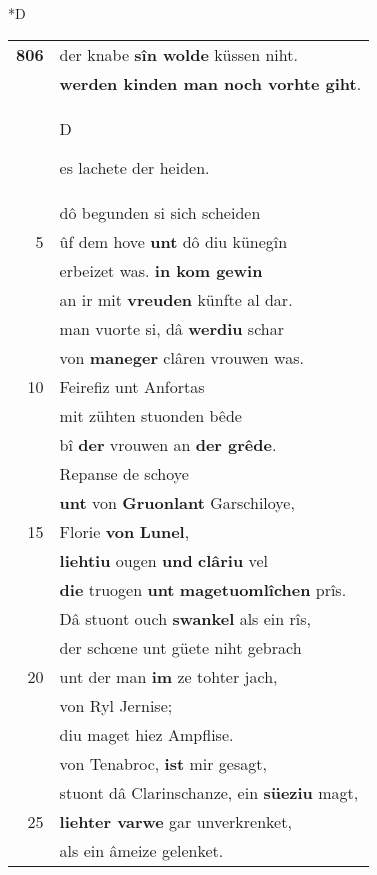 \documentclass[8pt,a4paper,notitlepage]{article}
\begin{document}
\begin{table}[ht]
\begin{minipage}[t]{0.5\linewidth}
\small
\begin{center}*D
\end{center}
\begin{tabular}{rl}
\textbf{806} & der knabe \textbf{sîn wolde} küssen niht.\\ 
 & \textbf{werden kinden man noch vorhte giht}.\\ 
 & \begin{large}D\end{large}es lachete der heiden.\\ 
 & dô begunden si sich scheiden\\ 
5 & ûf dem hove \textbf{unt} dô diu künegîn\\ 
 & erbeizet was. \textbf{in kom gewin}\\ 
 & an ir mit \textbf{vreuden} künfte al dar.\\ 
 & man vuorte si, dâ \textbf{werdiu} schar\\ 
 & von \textbf{maneger} clâren vrouwen was.\\ 
10 & Feirefiz unt Anfortas\\ 
 & mit zühten stuonden bêde\\ 
 & bî \textbf{der} vrouwen an \textbf{der grêde}.\\ 
 & Repanse de schoye\\ 
 & \textbf{unt} von \textbf{Gruonlant} Garschiloye,\\ 
15 & Florie \textbf{von} \textbf{Lunel},\\ 
 & \textbf{liehtiu} ougen \textbf{und} \textbf{clâriu} vel\\ 
 & \textbf{die} truogen \textbf{unt} \textbf{magetuomlîchen} prîs.\\ 
 & Dâ stuont ouch \textbf{swankel} als ein rîs,\\ 
 & der schœne unt güete niht gebrach\\ 
20 & unt der man \textbf{im} ze tohter jach,\\ 
 & von Ryl Jernise;\\ 
 & diu maget hiez Ampflise.\\ 
 & von Tenabroc, \textbf{ist} mir gesagt,\\ 
 & stuont dâ Clarinschanze, ein \textbf{süeziu} magt,\\ 
25 & \textbf{liehter varwe} gar unverkrenket,\\ 
 & als ein âmeize gelenket.\\ 

\end{tabular}
\end{minipage}
\end{table}
\end{document}
